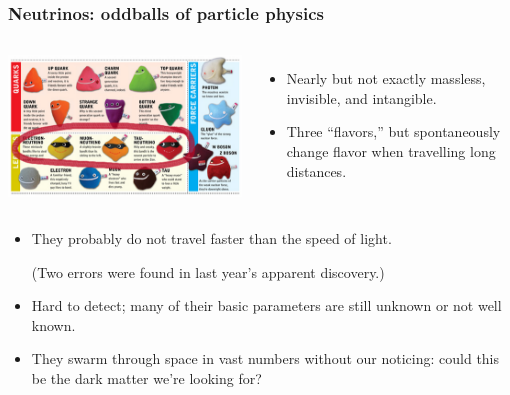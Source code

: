 \documentclass[compress]{beamer}
\begin{document}
\begin{frame}
\frametitle{Neutrinos: oddballs of particle physics}

\begin{columns}
\includegraphics[width=\linewidth]{pictures/standard_model.png}
\begin{itemize}
\item Nearly but not exactly massless, invisible, and intangible.
\item Three ``flavors,'' but spontaneously change flavor when
  travelling long distances.
\end{itemize}
\end{columns}

\vspace{0.25 cm}
\begin{itemize}
\item They probably do not travel faster than the speed of light.

  (Two errors were found in last year's apparent discovery.)

\item Hard to detect; many of their basic parameters are still unknown or not well
  known.

\item They swarm through space in vast numbers without our noticing:
  could this be the dark matter we're looking for?
\end{itemize}
\end{frame}
\end{document}
